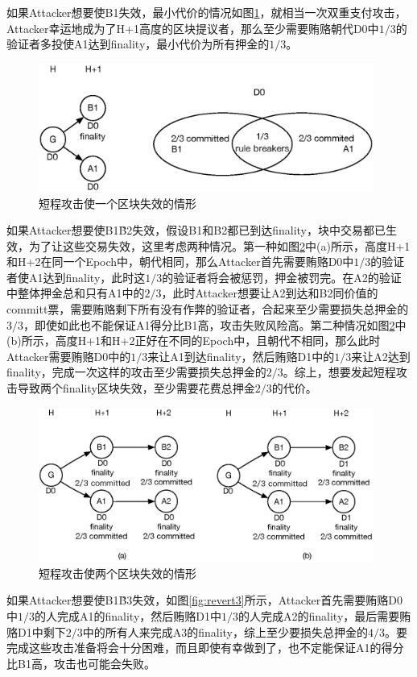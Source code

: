 如果Attacker想要使B1失效，最小代价的情况如图\ref{fig:revert1}，就相当一次双重支付攻击，Attacker幸运地成为了H+1高度的区块提议者，那么至少需要贿赂朝代D0中$1/3$的验证者多投使A1达到finality，最小代价为所有押金的$1/3$。

\begin{figure}[h]
\centering
\includegraphics[width=11cm]{./figs/revert1}
\caption{短程攻击使一个区块失效的情形}
\label{fig:revert1}
\end{figure}

如果Attacker想要使B1\~B2失效，假设B1和B2都已到达finality，块中交易都已生效，为了让这些交易失效，这里考虑两种情况。第一种如图\ref{fig:revert2}中(a)所示，高度H+1和H+2在同一个Epoch中，朝代相同，那么Attacker首先需要贿赂D0中$1/3$的验证者使A1达到finality，此时这$1/3$的验证者将会被惩罚，押金被罚完。在A2的验证中整体押金总和只有A1中的$2/3$，此时Attacker想要让A2到达和B2同价值的committ票，需要贿赂剩下所有没有作弊的验证者，合起来至少需要损失总押金的$3/3$，即使如此也不能保证A1得分比B1高，攻击失败风险高。第二种情况如图\ref{fig:revert2}中(b)所示，高度H+1和H+2正好在不同的Epoch中，且朝代不相同，那么此时Attacker需要贿赂D0中的$1/3$来让A1到达finality，然后贿赂D1中的$1/3$来让A2达到finality，完成一次这样的攻击至少需要损失总押金的$2/3$。综上，想要发起短程攻击导致两个finality区块失效，至少需要花费总押金$2/3$的代价。

\begin{figure}[h]
\centering
\includegraphics[width=11cm]{./figs/revert2}
\caption{短程攻击使两个区块失效的情形}
\label{fig:revert2}
\end{figure}


如果Attacker想要使B1\~B3失效，如图\ref{fig:revert3}所示，Attacker首先需要贿赂D0中$1/3$的人完成A1的finality，然后贿赂D1中$1/3$的人完成A2的finality，最后需要贿赂D1中剩下$2/3$中的所有人来完成A3的finality，综上至少要损失总押金的$4/3$。要完成这些攻击准备将会十分困难，而且即使有幸做到了，也不定能保证A1的得分比B1高，攻击也可能会失败。

